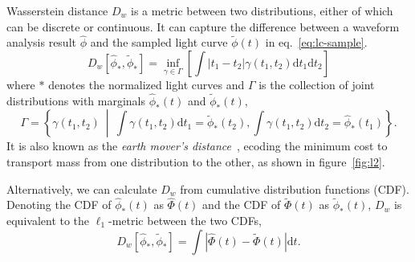 Wasserstein distance $D_w$ is a metric between two distributions, either of which can be discrete or continuous. It can capture the difference between a waveform analysis result $\hat{\phi}$ and the sampled light curve $\tilde{\phi}(t)$ in eq.~\eqref{eq:lc-sample}.
\begin{equation}
  D_w\left[\hat{\phi}_*, \tilde{\phi}_*\right] = \inf_{\gamma \in \Gamma} \left[\int \left\vert t_1 - t_2 \right\vert \gamma(t_1, t_2)\mathrm{d}t_1\mathrm{d}t_2\right]
\end{equation}
where $*$ denotes the normalized light curves and $\Gamma$ is the collection of joint distributions with marginals $\hat{\phi}_*(t)$ and $\tilde{\phi}_*(t)$,
\begin{equation*}
  \label{eq:joint}
  \Gamma = \left\{\gamma(t_1, t_2) ~\middle\vert~ \int\gamma(t_1,t_2)\mathrm{d}t_1 = \tilde{\phi}_*(t_2) , \int\gamma(t_1,t_2)\mathrm{d}t_2 = \hat{\phi}_*(t_1) \right\}.
\end{equation*}
It is also known as the \textit{earth mover's distance}~\cite{levina_earth_2001}, ecoding the minimum cost to transport mass from one distribution to the other, as shown in figure~\ref{fig:l2}.

Alternatively, we can calculate $D_w$ from cumulative distribution functions (CDF). Denoting the CDF of $\hat{\phi}_*(t)$ as $\hat\Phi(t)$ and the CDF of $\tilde\Phi(t)$ as $\tilde{\phi}_*(t)$, $D_w$ is equivalent to the $\ell_1$-metric between the two CDFs,
\begin{equation}
    D_w\left[\hat{\phi}_*, \tilde{\phi}_*\right] = \int\left|\hat{\Phi}(t) - \tilde{\Phi}(t)\right| \mathrm{d}t.
    \label{eq:numerical}
\end{equation}
